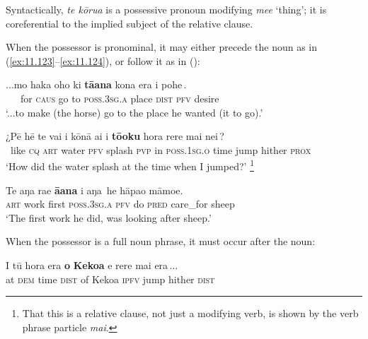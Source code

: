 Syntactically, \textit{te kōrua} is a possessive pronoun modifying \textit{me{\ꞌ}e} ‘thing’; it is coreferential to the implied subject of the relative clause. 

When the possessor is pronominal, it may either precede the noun as in (\ref{ex:11.123}–\ref{ex:11.124}), or follow it as in  ():

\ea\label{ex:11.123}
\gll ...mo haka oho ki \textbf{tā}\textbf{{\ꞌ}}\textbf{ana} kona era {\ob}i pohe\,{\cb}. \\
~~~for \textsc{caus} go to \textsc{poss.3sg.a} place \textsc{dist} {\db}\textsc{pfv} desire \\

\glt 
‘...to make (the horse) go to the place he wanted (it to go).’ \textstyleExampleref{[R345.087]} 
\z

\ea\label{ex:11.124}
\gll ¿Pē hē te vai i kōnā ai {\ꞌ}i \textbf{tō{\ꞌ}oku} hora {\ob}rere mai nei\,{\cb}? \\
~like \textsc{cq} \textsc{art} water \textsc{pfv} splash \textsc{pvp} in \textsc{poss.1sg.o} time {\db}jump hither \textsc{prox} \\

\glt 
‘How did the water splash at the time when I jumped?’ \textstyleExampleref{[R108.125]}\footnote{That this is a relative clause, not just a modifying verb, is shown by the verb phrase particle \textit{mai}.}
\z



\ea\label{ex:11.125}
\gll Te aŋa ra{\ꞌ}e \textbf{{\ꞌ}ā{\ꞌ}ana} {\ob}i aŋa\,{\cb} he hāpa{\ꞌ}o māmoe. \\
\textsc{art} work first \textsc{poss.3sg.a} {\db}\textsc{pfv} do \textsc{pred} care\_for sheep \\

\glt
‘The first work he did, was looking after sheep.’ \textstyleExampleref{[R487.015]} 
\z

When the possessor is a full noun phrase, it must occur after the noun:

\ea\label{ex:11.126}
\gll {\ꞌ}I tū hora era \textbf{o} \textbf{Kekoa} {\ob}e rere mai era\,{\cb}...\\
at \textsc{dem} time \textsc{dist} of Kekoa {\db}\textsc{ipfv} jump hither \textsc{dist}\\

